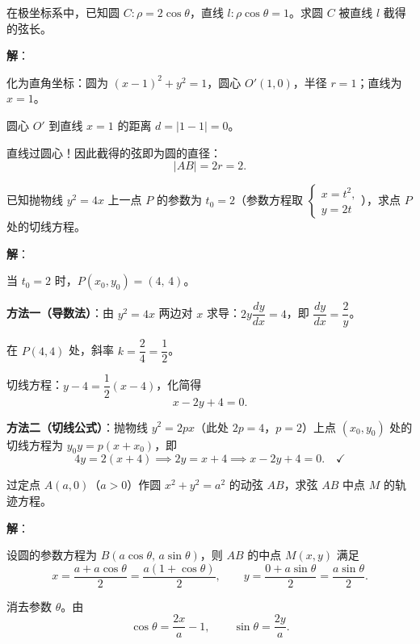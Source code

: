 \documentclass[12pt,a4paper]{ctexart}
\theoremstyle{definition}
\begin{document}
\begin{example}
  在极坐标系中，已知圆 $C:\rho=2\cos\theta$，直线 $l:\rho\cos\theta=1$。求圆 $C$ 被直线 $l$ 截得的弦长。
\end{example}

\textbf{解}：

化为直角坐标：圆为 $(x-1)^2+y^2=1$，圆心 $O'(1,0)$，半径 $r=1$；直线为 $x=1$。

圆心 $O'$ 到直线 $x=1$ 的距离 $d = |1-1| = 0$。

直线过圆心！因此截得的弦即为圆的直径：
\[
  |AB| = 2r = \boxed{2}.
\]

\begin{example}
  已知抛物线 $y^2=4x$ 上一点 $P$ 的参数为 $t_0=2$（参数方程取 $\begin{cases} x=t^2,\\ y=2t \end{cases}$），求点 $P$ 处的切线方程。
\end{example}

\textbf{解}：

当 $t_0=2$ 时，$P(x_0,y_0) = (4,\,4)$。

\textbf{方法一（导数法）}：由 $y^2=4x$ 两边对 $x$ 求导：$2y\dfrac{dy}{dx}=4$，即 $\dfrac{dy}{dx}=\dfrac{2}{y}$。

在 $P(4,4)$ 处，斜率 $k = \dfrac{2}{4} = \dfrac{1}{2}$。

切线方程：$y - 4 = \dfrac{1}{2}(x-4)$，化简得
\[
  \boxed{x - 2y + 4 = 0.}
\]

\textbf{方法二（切线公式）}：抛物线 $y^2=2px$（此处 $2p=4$，$p=2$）上点 $(x_0,y_0)$ 处的切线方程为 $y_0 y = p(x+x_0)$，即
\[
  4y = 2(x+4) \implies 2y = x+4 \implies x-2y+4=0. \quad\checkmark
\]

\begin{example}
  过定点 $A(a,0)$（$a>0$）作圆 $x^2+y^2=a^2$ 的动弦 $AB$，求弦 $AB$ 中点 $M$ 的轨迹方程。
\end{example}

\textbf{解}：

设圆的参数方程为 $B(a\cos\theta,\,a\sin\theta)$，则 $AB$ 的中点 $M(x,y)$ 满足
\[
  x = \frac{a+a\cos\theta}{2} = \frac{a(1+\cos\theta)}{2}, \qquad y = \frac{0+a\sin\theta}{2} = \frac{a\sin\theta}{2}.
\]

消去参数 $\theta$。由
\[
  \cos\theta = \frac{2x}{a}-1, \qquad \sin\theta = \frac{2y}{a}.
\]
\end{document}

